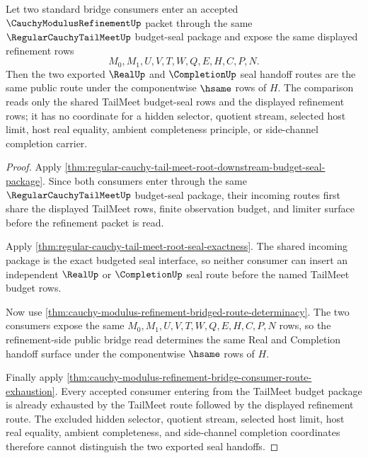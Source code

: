 \begin{theorem}
\label{thm:cauchy-modulus-refinement-tailmeet-budget-route-uniqueness}
Let two standard bridge consumers enter an accepted $\CauchyModulusRefinementUp$ packet through the same $\RegularCauchyTailMeetUp$ budget-seal package and expose the same displayed refinement rows
$$
M_0,M_1,U,V,T,W,Q,E,H,C,P,N.
$$
Then the two exported $\RealUp$ and $\CompletionUp$ seal handoff routes are the same public route under the componentwise $\hsame$ rows of $H$. The comparison reads only the shared TailMeet budget-seal rows and the displayed refinement rows; it has no coordinate for a hidden selector, quotient stream, selected host limit, host real equality, ambient completeness principle, or side-channel completion carrier.
\end{theorem}
\begin{proof}
Apply \autoref{thm:regular-cauchy-tail-meet-root-downstream-budget-seal-package}. Since both consumers enter through the same $\RegularCauchyTailMeetUp$ budget-seal package, their incoming routes first share the displayed TailMeet rows, finite observation budget, and limiter surface before the refinement packet is read.

Apply \autoref{thm:regular-cauchy-tail-meet-root-seal-exactness}. The shared incoming package is the exact budgeted seal interface, so neither consumer can insert an independent $\RealUp$ or $\CompletionUp$ seal route before the named TailMeet budget rows.

Now use \autoref{thm:cauchy-modulus-refinement-bridged-route-determinacy}. The two consumers expose the same $M_0,M_1,U,V,T,W,Q,E,H,C,P,N$ rows, so the refinement-side public bridge read determines the same Real and Completion handoff surface under the componentwise $\hsame$ rows of $H$.

Finally apply \autoref{thm:cauchy-modulus-refinement-bridge-consumer-route-exhaustion}. Every accepted consumer entering from the TailMeet budget package is already exhausted by the TailMeet route followed by the displayed refinement route. The excluded hidden selector, quotient stream, selected host limit, host real equality, ambient completeness, and side-channel completion coordinates therefore cannot distinguish the two exported seal handoffs.
\end{proof}

